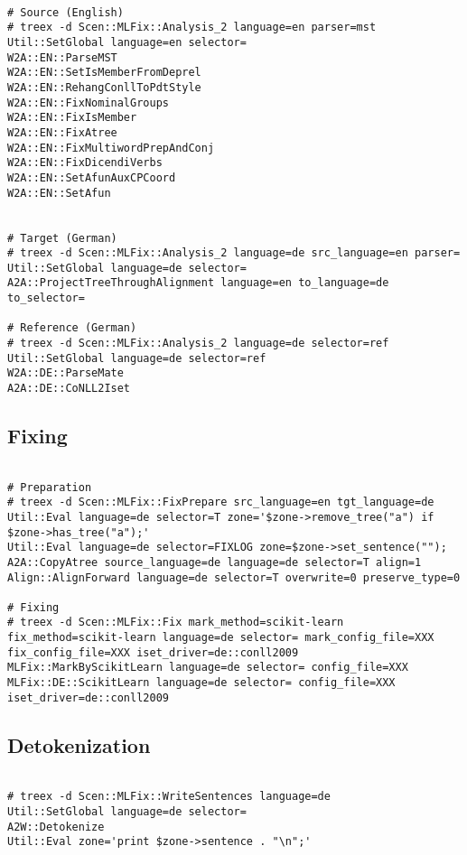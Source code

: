 \begin{lstlisting}

# Source (English)
# treex -d Scen::MLFix::Analysis_2 language=en parser=mst
Util::SetGlobal language=en selector=
W2A::EN::ParseMST
W2A::EN::SetIsMemberFromDeprel
W2A::EN::RehangConllToPdtStyle
W2A::EN::FixNominalGroups
W2A::EN::FixIsMember
W2A::EN::FixAtree
W2A::EN::FixMultiwordPrepAndConj
W2A::EN::FixDicendiVerbs
W2A::EN::SetAfunAuxCPCoord
W2A::EN::SetAfun


# Target (German)
# treex -d Scen::MLFix::Analysis_2 language=de src_language=en parser=
Util::SetGlobal language=de selector=
A2A::ProjectTreeThroughAlignment language=en to_language=de to_selector=

# Reference (German)
# treex -d Scen::MLFix::Analysis_2 language=de selector=ref
Util::SetGlobal language=de selector=ref
W2A::DE::ParseMate
A2A::DE::CoNLL2Iset

\end{lstlisting}

\subsection{Fixing}

\begin{lstlisting}

# Preparation
# treex -d Scen::MLFix::FixPrepare src_language=en tgt_language=de
Util::Eval language=de selector=T zone='$zone->remove_tree("a") if $zone->has_tree("a");'
Util::Eval language=de selector=FIXLOG zone=$zone->set_sentence("");
A2A::CopyAtree source_language=de language=de selector=T align=1
Align::AlignForward language=de selector=T overwrite=0 preserve_type=0

# Fixing
# treex -d Scen::MLFix::Fix mark_method=scikit-learn fix_method=scikit-learn language=de selector= mark_config_file=XXX fix_config_file=XXX iset_driver=de::conll2009
MLFix::MarkByScikitLearn language=de selector= config_file=XXX
MLFix::DE::ScikitLearn language=de selector= config_file=XXX iset_driver=de::conll2009

\end{lstlisting}

\subsection{Detokenization}

\begin{lstlisting}

# treex -d Scen::MLFix::WriteSentences language=de
Util::SetGlobal language=de selector=
A2W::Detokenize
Util::Eval zone='print $zone->sentence . "\n";'

\end{lstlisting}

